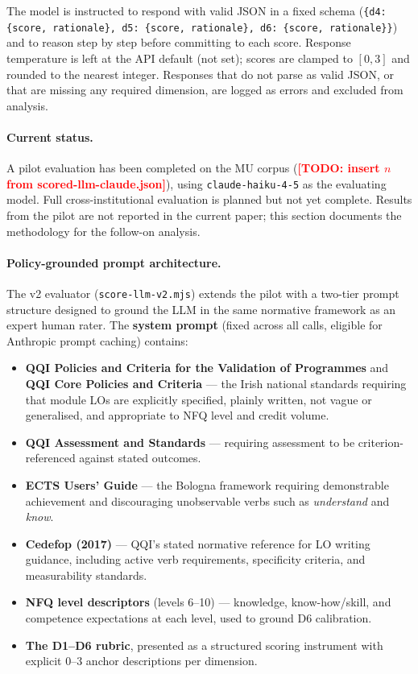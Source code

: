 \documentclass[12pt, a4paper]{article}
\newcommand{\todo}[1]{\textcolor{red}{\textbf{[TODO: #1]}}}
\begin{document}
The model is instructed to respond with valid JSON in a fixed schema
(\texttt{\{d4: \{score, rationale\}, d5: \{score, rationale\}, d6: \{score, rationale\}\}})
and to reason step by step before committing to each score. Response temperature is
left at the API default (not set); scores are clamped to $[0, 3]$ and rounded to the
nearest integer. Responses that do not parse as valid JSON, or that are missing any
required dimension, are logged as errors and excluded from analysis.

\paragraph{Current status.}
A pilot evaluation has been completed on the MU corpus
(\todo{insert $n$ from scored-llm-claude.json}), using \texttt{claude-haiku-4-5}
as the evaluating model. Full cross-institutional evaluation is planned but not yet
complete. Results from the pilot are not reported in the current paper; this section
documents the methodology for the follow-on analysis.

\paragraph{Policy-grounded prompt architecture.}
The v2 evaluator (\texttt{score-llm-v2.mjs}) extends the pilot with a two-tier prompt
structure designed to ground the LLM in the same normative framework as an expert
human rater. The \textbf{system prompt} (fixed across all calls, eligible for Anthropic
prompt caching) contains:

\begin{itemize}
  \item \textbf{QQI Policies and Criteria for the Validation of Programmes}
    \citep{qqi2017validation} and \textbf{QQI Core Policies and Criteria}
    \citep{qqi2024core} — the Irish national standards requiring that module LOs
    are explicitly specified, plainly written, not vague or generalised, and
    appropriate to NFQ level and credit volume.
  \item \textbf{QQI Assessment and Standards} \citep{qqi2022assessment} — requiring
    assessment to be criterion-referenced against stated outcomes.
  \item \textbf{ECTS Users' Guide} \citep{ec2015ects} — the Bologna framework
    requiring demonstrable achievement and discouraging unobservable verbs such as
    \textit{understand} and \textit{know}.
  \item \textbf{Cedefop (2017)} \citep{cedefop2017lo} — QQI's stated normative
    reference for LO writing guidance, including active verb requirements, specificity
    criteria, and measurability standards.
  \item \textbf{NFQ level descriptors} (levels 6--10) — knowledge, know-how/skill,
    and competence expectations at each level, used to ground D6 calibration.
  \item \textbf{The D1--D6 rubric}, presented as a structured scoring instrument
    with explicit 0--3 anchor descriptions per dimension.
\end{itemize}
\end{document}
